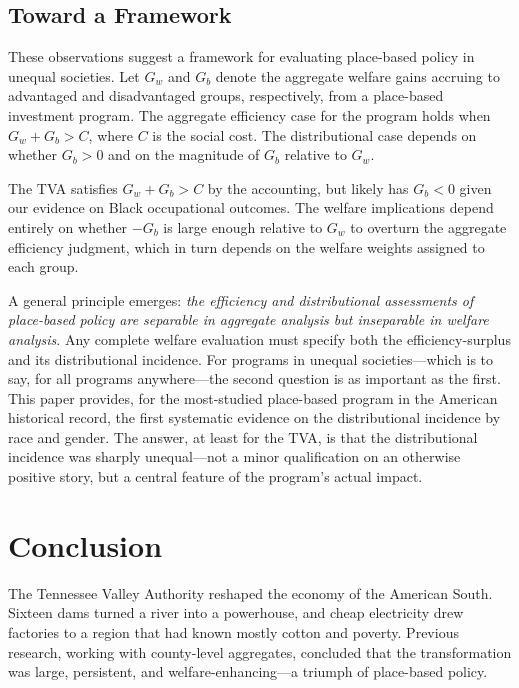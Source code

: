 \documentclass[12pt]{article}
\begin{document}
\subsection{Toward a Framework}

These observations suggest a framework for evaluating place-based policy in unequal societies. Let $G_w$ and $G_b$ denote the aggregate welfare gains accruing to advantaged and disadvantaged groups, respectively, from a place-based investment program. The aggregate efficiency case for the program holds when $G_w + G_b > C$, where $C$ is the social cost. The distributional case depends on whether $G_b > 0$ and on the magnitude of $G_b$ relative to $G_w$.

The TVA satisfies $G_w + G_b > C$ by the \citet{kline2014} accounting, but likely has $G_b < 0$ given our evidence on Black occupational outcomes. The welfare implications depend entirely on whether $-G_b$ is large enough relative to $G_w$ to overturn the aggregate efficiency judgment, which in turn depends on the welfare weights assigned to each group.

A general principle emerges: \textit{the efficiency and distributional assessments of place-based policy are separable in aggregate analysis but inseparable in welfare analysis}. Any complete welfare evaluation must specify both the efficiency-surplus and its distributional incidence. For programs in unequal societies---which is to say, for all programs anywhere---the second question is as important as the first. This paper provides, for the most-studied place-based program in the American historical record, the first systematic evidence on the distributional incidence by race and gender. The answer, at least for the TVA, is that the distributional incidence was sharply unequal---not a minor qualification on an otherwise positive story, but a central feature of the program's actual impact.



\section{Conclusion}\label{sec:conclusion}

The Tennessee Valley Authority reshaped the economy of the American South. Sixteen dams turned a river into a powerhouse, and cheap electricity drew factories to a region that had known mostly cotton and poverty. Previous research, working with county-level aggregates, concluded that the transformation was large, persistent, and welfare-enhancing---a triumph of place-based policy.
\end{document}
